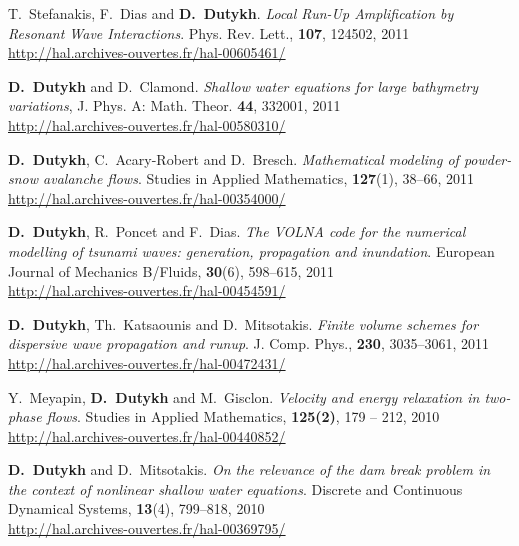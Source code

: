 \documentclass[final, a4paper, oneside, 12pt]{article}
\numberwithin{equation}{section}
\begin{document}
\begin{etaremune}
  \item T.~Stefanakis, F.~Dias and \textbf{D.~Dutykh}. \textit{Local Run-Up Amplification by Resonant Wave Interactions}. Phys. Rev. Lett., \textbf{107}, 124502, 2011 \\ %
  \url{http://hal.archives-ouvertes.fr/hal-00605461/}
  
  \item \textbf{D.~Dutykh} and D.~Clamond. \textit{Shallow water equations for large bathymetry variations}, J. Phys. A: Math. Theor. \textbf{44}, 332001, 2011 \\ %
  \url{http://hal.archives-ouvertes.fr/hal-00580310/}
      
  \item \textbf{D.~Dutykh}, C.~Acary-Robert and D.~Bresch. \textit{Mathematical modeling of powder-snow avalanche flows}. Studies in Applied Mathematics, \textbf{127}(1), 38--66, 2011 \\ %
  \url{http://hal.archives-ouvertes.fr/hal-00354000/}

  \item \textbf{D.~Dutykh}, R.~Poncet and F.~Dias. \textit{The VOLNA code for the numerical modelling of tsunami waves: generation, propagation and inundation}. European Journal of Mechanics B/Fluids, \textbf{30}(6), 598--615, 2011 \\ %
  \url{http://hal.archives-ouvertes.fr/hal-00454591/}
    
  \item \textbf{D.~Dutykh}, Th.~Katsaounis and D.~Mitsotakis. \textit{Finite volume schemes for dispersive wave propagation and runup}. J. Comp. Phys., \textbf{230}, 3035--3061, 2011 \\ %
  \url{http://hal.archives-ouvertes.fr/hal-00472431/}
  
  
  \item Y.~Meyapin, \textbf{D.~Dutykh} and M.~Gisclon. \textit{Velocity and energy relaxation in two-phase flows}. Studies in Applied Mathematics, \textbf{125(2)}, 179 -- 212, 2010 \\ %
  \url{http://hal.archives-ouvertes.fr/hal-00440852/}

  \item \textbf{D.~Dutykh} and D.~Mitsotakis. \textit{On the relevance of the dam break problem in the context of nonlinear shallow water equations}. Discrete and Continuous Dynamical Systems, \textbf{13}(4), 799--818, 2010 \\ %
  \url{http://hal.archives-ouvertes.fr/hal-00369795/}
  

\end{etaremune}
\end{document}

